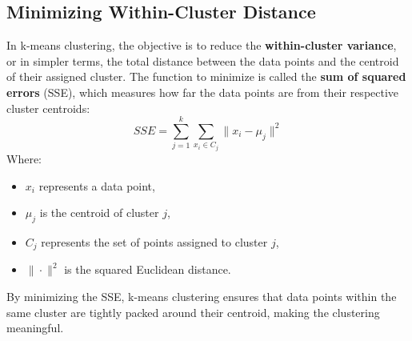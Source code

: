 \subsection{Minimizing Within-Cluster Distance}
\begin{flushleft}
    \large In k-means clustering, the objective is to reduce the \textbf{within-cluster variance}, or in simpler terms, the total distance between the data points and the centroid of their assigned cluster. The function to minimize is called the \textbf{sum of squared errors} (SSE), which measures how far the data points are from their respective cluster centroids:
    \[
    SSE = \sum_{j=1}^{k} \sum_{x_i \in C_j} \|x_i - \mu_j\|^2
    \]
    Where:
    \begin{itemize}
        \item \( x_i \) represents a data point,
        \item \( \mu_j \) is the centroid of cluster \( j \),
        \item \( C_j \) represents the set of points assigned to cluster \( j \),
        \item \( \|\cdot\|^2 \) is the squared Euclidean distance.
    \end{itemize}
    
    By minimizing the SSE, k-means clustering ensures that data points within the same cluster are tightly packed around their centroid, making the clustering meaningful.
\end{flushleft}

